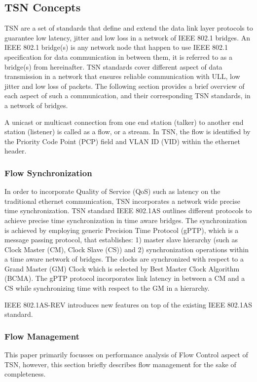 \documentclass[journal,12pt,twocolumn]{IEEEtran}
\begin{document}
\subsection{TSN Concepts}
TSN are a set of standards that define and extend the data link layer protocols to guarantee low latency, jitter and low loss in a network of IEEE 802.1 bridges. An IEEE 802.1 bridge(s) is any network node that happen to use IEEE 802.1 specification for data communication in between them, it is referred to as a bridge(s) from hereinafter. TSN standards cover different aspect of data transmission in a network that ensures reliable communication with ULL, low jitter and low loss of packets. The following section provides a brief overview of each aspect of such a communication, and their corresponding TSN standards, in a network of bridges.

A unicast or multicast connection from one end station (talker) to another end station (listener) is called as a flow, or a stream. In TSN, the flow is identified by the Priority Code Point (PCP) field and VLAN ID (VID) within the ethernet header.

\subsubsection{Flow Synchronization}
In order to incorporate Quality of Service (QoS) such as latency on the traditional ethernet communication, TSN incorporates a network wide precise time synchronization. TSN standard IEEE 802.1AS outlines different protocols to achieve precise time synchronization in time aware bridges. The synchronization is achieved by employing generic Precision Time Protocol (gPTP), which is a message passing protocol, that establishes: 1) master slave hierarchy (such as Clock Master (CM), Clock Slave (CS)) and 2) synchronization operations within a time aware network of bridges. The clocks are synchronized with respect to a Grand Master (GM) Clock which is selected by Best Master Clock Algorithm (BCMA). The gPTP protocol incorporates link latency in between a CM and a CS while synchronizing time with respect to the GM in a hierarchy.

IEEE 802.1AS-REV introduces new features on top of the existing IEEE 802.1AS standard.
\subsubsection{Flow Management}
This paper primarily focusses on performance analysis of Flow Control aspect of TSN, however, this section briefly describes flow management for the sake of completeness.
\end{document}
